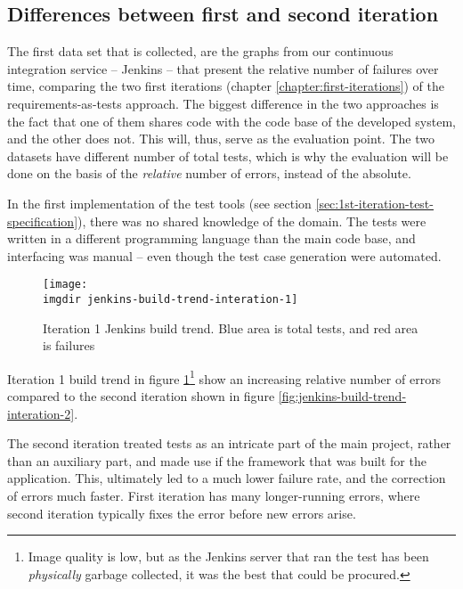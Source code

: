 \subsection{Differences between first and second iteration}
\label{ssec:first-and-second-iteration-differences}
The first data set that is collected, are the graphs from our continuous integration service -- Jenkins -- that present the relative number of failures over time, comparing the two first iterations (chapter \ref{chapter:first-iterations}) of the requirements-as-tests approach. The biggest difference in the two approaches is the fact that one of them shares code with the code base of the developed system, and the other does not. This will, thus, serve as the evaluation point. The two datasets have different number of total tests, which is why the evaluation will be done on the basis of the \emph{relative} number of errors, instead of the absolute.\medskip

\noindent In the first implementation of the test tools (see section \ref{sec:1st-iteration-test-specification}), there was no shared knowledge of the domain. The tests were written in a different programming language than the main code base, and interfacing was manual -- even though the test case generation were automated.\medskip
\begin{figure}[!hbpt]
\centering
\texttt{[image: \\imgdir jenkins-build-trend-interation-1]}
\caption{Iteration 1 Jenkins build trend. Blue area is total tests, and red area is failures}
\label{fig:jenkins-build-trend-interation-1}
\end{figure}

\noindent Iteration 1 build trend in figure \ref{fig:jenkins-build-trend-interation-1}\footnote{Image quality is low, but as the Jenkins server that ran the test has been \emph{physically} garbage collected, it was the best that could be procured.} show an increasing relative number of errors compared to the second iteration shown in figure \ref{fig:jenkins-build-trend-interation-2}.\medskip

\noindent The second iteration treated tests as an intricate part of the main project, rather than an auxiliary part, and made use if the framework that was built for the application. This, ultimately led to a much lower failure rate, and the correction of errors much faster. First iteration has many longer-running errors, where second iteration typically fixes the error before new errors arise.

